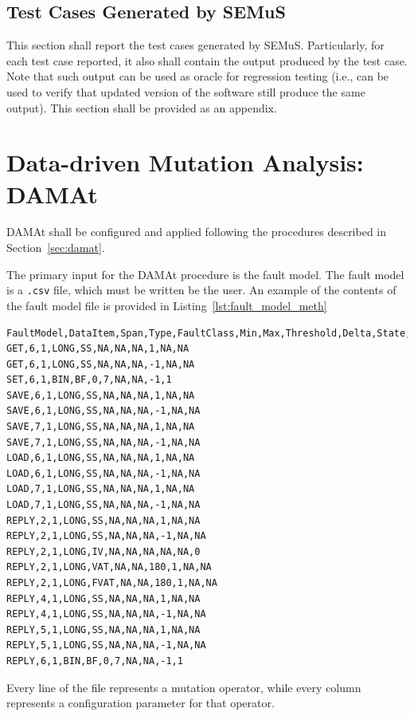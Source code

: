 \subsection{Test Cases Generated by SEMuS}

This section shall report the test cases generated by SEMuS. Particularly, for each test case reported, it also shall contain the output produced by the test case. Note that such output can be used as oracle for regression testing (i.e., can be used to verify that updated version of the software still produce the same output).
This section shall be provided as an appendix.


 \ENDCHANGEDFINAL


\clearpage
\section{Data-driven Mutation Analysis: DAMAt}
\label{sec:meth:damat}

DAMAt shall be configured and applied following the procedures described in Section~\ref{sec:damat}.

\STARTCHANGEDFINAL

The primary input for the DAMAt procedure is the fault model.
The fault model is a \texttt{.csv} file, which must be written be the user.
An example of the contents of the fault model file is provided in Listing~\ref{lst:fault_model_meth}

\begin{lstlisting}[caption={Example of a DAMAt fault model, represented in a \texttt{.csv} file. },label={lst:fault_model_meth}]
FaultModel,DataItem,Span,Type,FaultClass,Min,Max,Threshold,Delta,State,Value
GET,6,1,LONG,SS,NA,NA,NA,1,NA,NA
GET,6,1,LONG,SS,NA,NA,NA,-1,NA,NA
SET,6,1,BIN,BF,0,7,NA,NA,-1,1
SAVE,6,1,LONG,SS,NA,NA,NA,1,NA,NA
SAVE,6,1,LONG,SS,NA,NA,NA,-1,NA,NA
SAVE,7,1,LONG,SS,NA,NA,NA,1,NA,NA
SAVE,7,1,LONG,SS,NA,NA,NA,-1,NA,NA
LOAD,6,1,LONG,SS,NA,NA,NA,1,NA,NA
LOAD,6,1,LONG,SS,NA,NA,NA,-1,NA,NA
LOAD,7,1,LONG,SS,NA,NA,NA,1,NA,NA
LOAD,7,1,LONG,SS,NA,NA,NA,-1,NA,NA
REPLY,2,1,LONG,SS,NA,NA,NA,1,NA,NA
REPLY,2,1,LONG,SS,NA,NA,NA,-1,NA,NA
REPLY,2,1,LONG,IV,NA,NA,NA,NA,NA,0
REPLY,2,1,LONG,VAT,NA,NA,180,1,NA,NA
REPLY,2,1,LONG,FVAT,NA,NA,180,1,NA,NA
REPLY,4,1,LONG,SS,NA,NA,NA,1,NA,NA
REPLY,4,1,LONG,SS,NA,NA,NA,-1,NA,NA
REPLY,5,1,LONG,SS,NA,NA,NA,1,NA,NA
REPLY,5,1,LONG,SS,NA,NA,NA,-1,NA,NA
REPLY,6,1,BIN,BF,0,7,NA,NA,-1,1
\end{lstlisting}

Every line of the file represents a mutation operator, while every column represents a configuration parameter for that operator.

